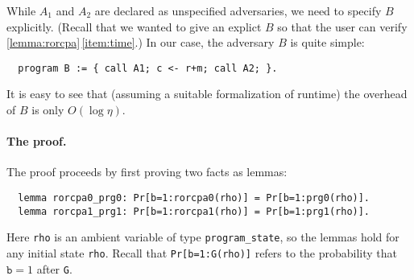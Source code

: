 \documentclass{article}
\begin{document}
While $A_1$
and $A_2$
are declared as unspecified adversaries, we need to specify $B$
explicitly. (Recall that we wanted to give an explict $B$
so that the user can verify
\autoref{lemma:rorcpa}\,\eqref{item:time}.) In our case, the adversary
$B$ is quite simple:
\begin{lstlisting}
  program B := { call A1; c <- r+m; call A2; }.
\end{lstlisting}
It is easy to see that (assuming a suitable formalization of runtime)
the overhead of $B$ is only $O(\log\eta)$.

\paragraph{The proof.} The proof proceeds by first proving two facts as lemmas:
\begin{lstlisting}
  lemma rorcpa0_prg0: Pr[b=1:rorcpa0(rho)] = Pr[b=1:prg0(rho)].
  lemma rorcpa1_prg1: Pr[b=1:rorcpa1(rho)] = Pr[b=1:prg1(rho)].
\end{lstlisting}
Here \texttt{rho} is an ambient variable of type
\texttt{program\_state}, so the lemmas hold for any initial state
\texttt{rho}. Recall that \texttt{Pr[b=1:G(rho)]} refers to the
probability that $\mathtt{b}=1$ after \texttt{G}.
\end{document}
